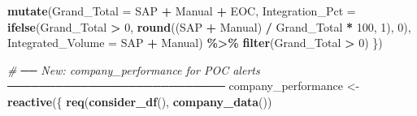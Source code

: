 \documentclass[
]{article}
\newenvironment{Shaded}{\begin{snugshade}}{\end{snugshade}}
\newcommand{\AttributeTok}[1]{\textcolor[rgb]{0.13,0.29,0.53}{#1}}
\newcommand{\CommentTok}[1]{\textcolor[rgb]{0.56,0.35,0.01}{\textit{#1}}}
\newcommand{\DecValTok}[1]{\textcolor[rgb]{0.00,0.00,0.81}{#1}}
\newcommand{\FunctionTok}[1]{\textcolor[rgb]{0.13,0.29,0.53}{\textbf{#1}}}
\newcommand{\NormalTok}[1]{#1}
\newcommand{\OtherTok}[1]{\textcolor[rgb]{0.56,0.35,0.01}{#1}}
\newcommand{\SpecialCharTok}[1]{\textcolor[rgb]{0.81,0.36,0.00}{\textbf{#1}}}
\begin{document}
\begin{Shaded}
\begin{Highlighting}[]
        \FunctionTok{mutate}\NormalTok{(}\AttributeTok{Grand\_Total       =}\NormalTok{ SAP }\SpecialCharTok{+}\NormalTok{ Manual }\SpecialCharTok{+}\NormalTok{ EOC,}
               \AttributeTok{Integration\_Pct   =} \FunctionTok{ifelse}\NormalTok{(Grand\_Total }\SpecialCharTok{\textgreater{}} \DecValTok{0}\NormalTok{, }\FunctionTok{round}\NormalTok{((SAP }\SpecialCharTok{+}\NormalTok{ Manual) }\SpecialCharTok{/}\NormalTok{ Grand\_Total }\SpecialCharTok{*} \DecValTok{100}\NormalTok{, }\DecValTok{1}\NormalTok{), }\DecValTok{0}\NormalTok{),}
               \AttributeTok{Integrated\_Volume =}\NormalTok{ SAP }\SpecialCharTok{+}\NormalTok{ Manual) }\SpecialCharTok{\%\textgreater{}\%}
        \FunctionTok{filter}\NormalTok{(Grand\_Total }\SpecialCharTok{\textgreater{}} \DecValTok{0}\NormalTok{)}
\NormalTok{    \})}
    
    \CommentTok{\# ── New: company\_performance for POC alerts ───────────────────────────}
\NormalTok{    company\_performance }\OtherTok{\textless{}{-}} \FunctionTok{reactive}\NormalTok{(\{}
      \FunctionTok{req}\NormalTok{(}\FunctionTok{consider\_df}\NormalTok{(), }\FunctionTok{company\_data}\NormalTok{())}
      

\end{Highlighting}
\end{Shaded}
\end{document}
